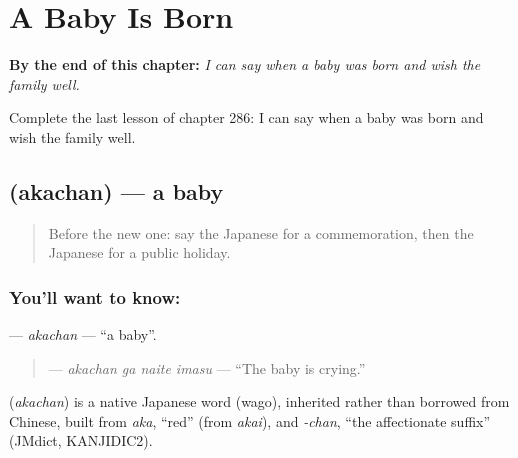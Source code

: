 
\chapter{A Baby Is Born}
\label{ch:ja-a-baby-is-born}

\begin{chapteropening}
\textbf{By the end of this chapter:} \emph{I can say when a baby was born and wish the family well.}

Complete the last lesson of chapter 286: I can say when a baby was born and wish the family well.
\end{chapteropening}

\section[\texorpdfstring{\ja{あかちゃん} (akachan)}{あかちゃん (akachan)}]{ (akachan) — a baby}

\label{lesson:JA-C286-akachan}



\begin{quote}
Before the new one: say the Japanese for a commemoration, then the Japanese for a public holiday.
\end{quote}

\subsection*{You'll want to know: }
\textbf{} — \emph{akachan} — \textquotedblleft{}a baby\textquotedblright{}.

\begin{quote}
\textbf{ } — \emph{akachan ga naite imasu} — \textquotedblleft{}The baby is crying.\textquotedblright{}
\end{quote}

\begin{cousinweb}
\textbf{} (\emph{akachan}) is a native Japanese word (wago), inherited rather than borrowed from Chinese, built from \emph{aka}, \textquotedblleft{}red\textquotedblright{} (from \emph{akai}), and \emph{-chan}, \textquotedblleft{}the affectionate suffix\textquotedblright{} (JMdict, KANJIDIC2).
\end{cousinweb}

